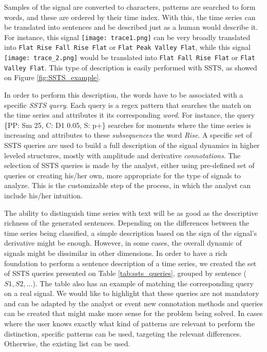 Samples of the signal are converted to characters, patterns are searched to form words, and these are ordered by their time index. With this, the time series can be translated into sentences and be described just as a human would describe it. For instance, this signal \texttt{[image: trace1.png]} can be very broadly translated into \texttt{Flat Rise Fall Rise Flat} or \texttt{Flat Peak Valley Flat}, while this signal \texttt{[image: trace\_2.png]} would be translated into \texttt{Flat Fall Rise Flat} or \texttt{Flat Valley Flat}. This type of description is easily performed with \gls{SSTS}, as showed on Figure \ref{fig:SSTS_example}.
\par
In order to perform this description, the words have to be associated with a specific \textit{\gls{SSTS} query}. Each query is a \gls{regex} pattern that searches the match on the time series and attributes it its corresponding \textit{word}. For instance, the query \{PP: Sm 25, C: D1 0.05, S: p+\} searches for moments where the time series is increasing and attributes to these \textit{subsequences} the word \textit{Rise}. A specific set of \gls{SSTS} queries are used to build a full description of the signal dynamics in higher leveled structures, mostly with amplitude and derivative \textit{connotations}. 
The selection of \gls{SSTS} queries is made by the analyst, either using pre-defined set of queries or creating his/her own, more appropriate for the type of signals to analyze. This is the customizable step of the process, in which the analyst can include his/her intuition.
\par
The ability to distinguish time series with text will be as good as the descriptive richness of the generated sentences. Depending on the differences between the time series being classified, a simple description based on the sign of the signal's derivative might be enough. However, in some cases, the overall dynamic of signals might be dissimilar in other dimensions. In order to have a rich foundation to perform a sentence description of a time series, we created the set of \gls{SSTS} queries presented on Table \ref{tab:ssts_queries}, grouped by sentence ($S1, S2, ...$). 
The table also has an example of matching the corresponding query on a real signal. We would like to highlight that these queries are not mandatory and can be adapted by the analyst or event new connotation methods and queries can be created that might make more sense for the problem being solved. In cases where the user knows exactly what kind of patterns are relevant to perform the distinction, specific patterns can be used, targeting the relevant differences. Otherwise, the existing list can be used.

